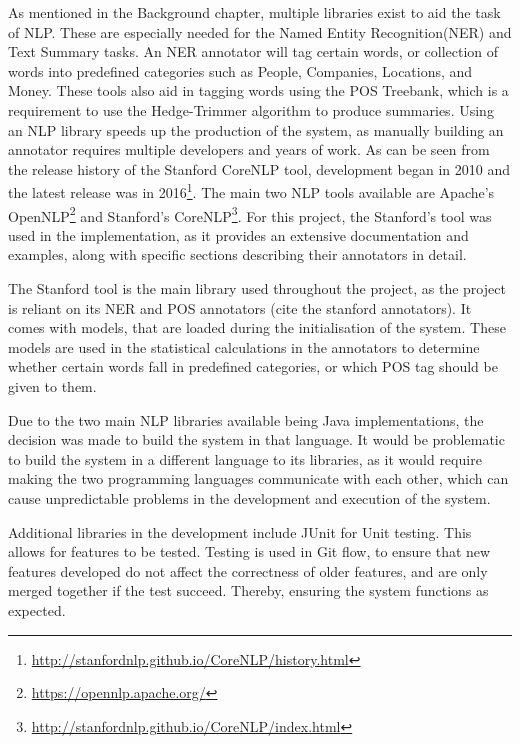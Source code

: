 \par As mentioned in the Background chapter, multiple libraries exist to aid the task of NLP. These are especially needed for the Named Entity Recognition(NER) and Text Summary tasks. An NER annotator will tag certain words, or collection of words into predefined categories such as People, Companies, Locations, and Money. These tools also aid in tagging words using the POS Treebank, which is a requirement to use the Hedge-Trimmer algorithm \cite{dorrzajicschwartz2003} to produce summaries. Using an NLP library speeds up the production of the system, as manually building an annotator requires multiple developers and years of work. As can be seen from the release history of the Stanford CoreNLP tool, development began in 2010 and the latest release was in 2016\footnote{\url{http://stanfordnlp.github.io/CoreNLP/history.html}}. The main two NLP tools available are Apache's OpenNLP\footnote{\url{https://opennlp.apache.org/}} and Stanford's CoreNLP\footnote{\url{http://stanfordnlp.github.io/CoreNLP/index.html}}. For this project, the Stanford's tool was used in the implementation, as it provides an extensive documentation and examples, along with specific sections describing their annotators in detail.

\par The Stanford tool is the main library used throughout the project, as the project is reliant on its NER and POS annotators (cite the stanford annotators). It comes with models, that are loaded during the initialisation of the system. These models are used in the statistical calculations in the annotators to determine whether certain words fall in predefined categories, or which POS tag should be given to them.

\par Due to the two main NLP libraries available being Java implementations, the decision was made to build the system in that language. It would be problematic to build the system in a different language to its libraries, as it would require making the two programming languages communicate with each other, which can cause unpredictable problems in the development and execution of the system.

\par Additional libraries in the development include JUnit for Unit testing. This allows for features to be tested. Testing is used in Git flow, to ensure that new features developed do not affect the correctness of older features, and are only merged together if the test succeed. Thereby, ensuring the system functions as expected.

